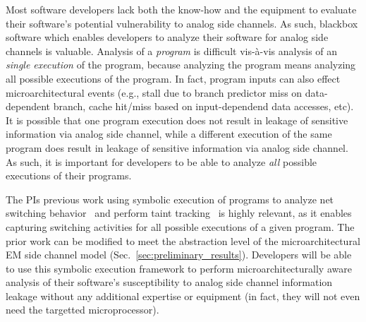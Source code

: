 \color{red}
Most software developers lack both the know-how and the equipment to evaluate
their software's potential vulnerability to analog side channels.  As such,
blackbox software which enables developers to analyze their software for analog
side channels is valuable. Analysis of a \textit{program} is difficult
vis-\`a-vis analysis of an \textit{single execution} of the program, because
analyzing the program means analyzing all possible executions of the program.
In fact, program inputs can also effect microarchitectural events (e.g.,
stall due to branch predictor miss on data-dependent branch, cache hit/miss
based on input-dependend data accesses, etc).  It is possible that
one program execution does not result in leakage of sensitive information
via analog side channel, while a different execution of the same program
does result in leakage of sensitive information via analog side channel.
As such, it is important for developers to be able to
analyze \textit{all} possible executions of their programs.

The PIs previous work using symbolic execution of programs to analyze net
switching behavior~\cite{cherupalli2017} and perform taint
tracking~\cite{cherupalli20172} is highly relevant, as it enables capturing
switching activities for all possible executions of a given program.  The prior
work can be modified to meet the abstraction level of the microarchitectural EM
side channel model (Sec.~\ref{sec:preliminary_results}).
Developers will be able to use this symbolic execution framework to perform
microarchitecturally aware analysis of their software's susceptibility to
analog side channel information leakage without any additional expertise or
equipment (in fact, they will not even need the targetted microprocessor).

